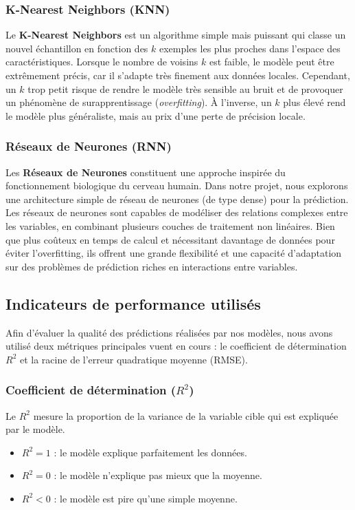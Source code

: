\documentclass[12pt]{report}
\begin{document}
\subsubsection{K-Nearest Neighbors (KNN)}

Le \textbf{K-Nearest Neighbors} est un algorithme simple mais puissant qui classe un nouvel échantillon en fonction des $k$ exemples les plus proches dans l'espace des caractéristiques. Lorsque le nombre de voisins $k$ est faible, le modèle peut être extrêmement précis, car il s'adapte très finement aux données locales. Cependant, un $k$ trop petit risque de rendre le modèle très sensible au bruit et de provoquer un phénomène de surapprentissage (\textit{overfitting}). À l'inverse, un $k$ plus élevé rend le modèle plus généraliste, mais au prix d'une perte de précision locale.

\subsubsection{Réseaux de Neurones (RNN)}

Les \textbf{Réseaux de Neurones} constituent une approche inspirée du fonctionnement biologique du cerveau humain. Dans notre projet, nous explorons une architecture simple de réseau de neurones (de type dense) pour la prédiction. Les réseaux de neurones sont capables de modéliser des relations complexes entre les variables, en combinant plusieurs couches de traitement non linéaires. Bien que plus coûteux en temps de calcul et nécessitant davantage de données pour éviter l'overfitting, ils offrent une grande flexibilité et une capacité d'adaptation sur des problèmes de prédiction riches en interactions entre variables.



\subsection{Indicateurs de performance utilisés}

Afin d’évaluer la qualité des prédictions réalisées par nos modèles, nous avons utilisé deux métriques principales vuent en cours : le coefficient de détermination \( R^2 \) et la racine de l’erreur quadratique moyenne (RMSE).

\subsubsection*{Coefficient de détermination (\( R^2 \))}

Le \( R^2 \) mesure la proportion de la variance de la variable cible qui est expliquée par le modèle. 
\begin{itemize}
    \item \( R^2 = 1 \) : le modèle explique parfaitement les données.
    \item \( R^2 = 0 \) : le modèle n'explique pas mieux que la moyenne.
    \item \( R^2 < 0 \) : le modèle est pire qu'une simple moyenne.
\end{itemize}
\end{document}
